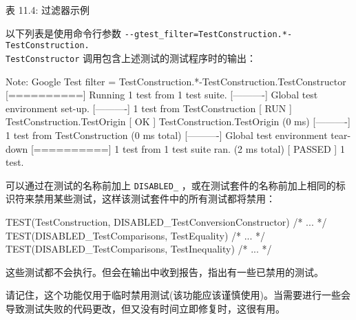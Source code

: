 \begin{center}
表 11.4: 过滤器示例
\end{center}

以下列表是使用命令行参数 \verb|--gtest_filter=TestConstruction.*-TestConstruction.|\\\verb|TestConstructor| 调用包含上述测试的测试程序时的输出：

\begin{shell}
Note: Google Test filter = TestConstruction.*-TestConstruction.TestConstructor
[==========] Running 1 test from 1 test suite.
[----------] Global test environment set-up.
[----------] 1 test from TestConstruction
[ RUN      ] TestConstruction.TestOrigin
[       OK ] TestConstruction.TestOrigin (0 ms)
[----------] 1 test from TestConstruction (0 ms total)
[----------] Global test environment tear-down
[==========] 1 test from 1 test suite ran. (2 ms total)
[  PASSED  ] 1 test.
\end{shell}

可以通过在测试的名称前加上 \verb|DISABLED_| ，或在测试套件的名称前加上相同的标识符来禁用某些测试，这样该测试套件中的所有测试都将禁用：

\begin{cpp}
TEST(TestConstruction, DISABLED_TestConversionConstructor)
{ /* ... */ }
TEST(DISABLED_TestComparisons, TestEquality)
{ /* ... */ }
TEST(DISABLED_TestComparisons, TestInequality)
{ /* ... */ }
\end{cpp}

这些测试都不会执行。但会在输出中收到报告，指出有一些已禁用的测试。

请记住，这个功能仅用于临时禁用测试(该功能应该谨慎使用)。当需要进行一些会导致测试失败的代码更改，但又没有时间立即修复时，这很有用。



